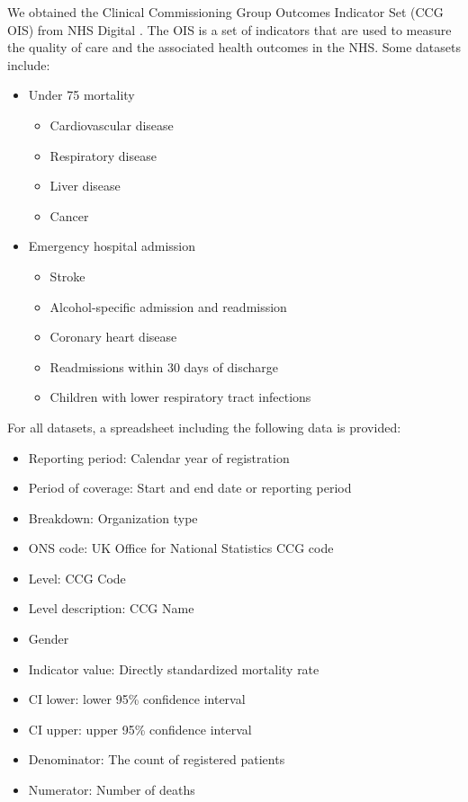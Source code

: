 We obtained the Clinical Commissioning Group Outcomes Indicator Set (CCG OIS) from NHS Digital \cite{nhsdigitalClinical}. The OIS is a set of indicators that are used to measure the quality of care and the associated health outcomes in the NHS. Some datasets include:
\begin{itemize}
    \item Under 75 mortality
    \begin{multicols}{2}
        \begin{itemize}
            \item Cardiovascular disease
            \item Respiratory disease
            \item Liver disease
            \item Cancer
        \end{itemize}
    \end{multicols}
    \item Emergency hospital admission
        \begin{itemize}
            \item Stroke
            \item Alcohol-specific admission and readmission
            \item Coronary heart disease
            \item Readmissions within 30 days of discharge
            \item Children with lower respiratory tract infections
        \end{itemize}
\end{itemize}

For all datasets, a spreadsheet including the following data is provided:

\begin{itemize}
    \item Reporting period: Calendar year of registration
    \item Period of coverage: Start and end date or reporting period
    \item Breakdown: Organization type
    \item ONS code: UK Office for National Statistics CCG code
    \item Level: CCG Code
    \item Level description: CCG Name
    \item Gender
    \item Indicator value: Directly standardized mortality rate
    \item CI lower: lower 95\% confidence interval
    \item CI upper: upper 95\% confidence interval
    \item Denominator: The count of registered patients
    \item Numerator: Number of deaths
\end{itemize}